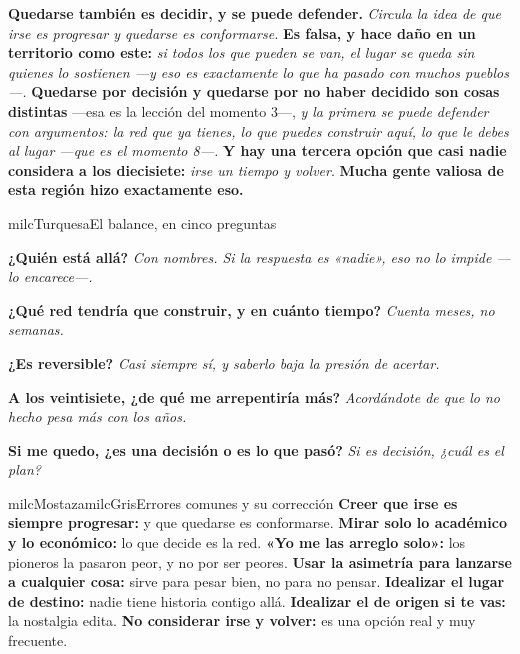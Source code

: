 \documentclass[11pt,letterpaper]{article}
\newcommand{\milcpaso}[3]{%
\Needspace{4\baselineskip}%
\begin{tcolorbox}[enhanced,colback=white,colframe=milcLinea,arc=1.5mm,boxrule=.9pt,
  left=14mm,right=4mm,top=3mm,bottom=3mm,before skip=4pt,after skip=4pt,
  fontupper=\RaggedRight,
  overlay={\node[anchor=north west,circle,fill=#2,text=white,inner sep=0pt,
    minimum size=7.4mm,font=\sffamily\bfseries\small]
    at ([xshift=3.6mm,yshift=-3.2mm]frame.north west) {#1};}]
#3
\end{tcolorbox}}
\begin{document}
\milcpaso{4}{milcTurquesa}{\textbf{Quedarse también es decidir, y se puede defender.} \emph{Circula la idea de que irse es progresar y quedarse es conformarse.} \textbf{Es falsa, y hace daño en un territorio como este:} \emph{si todos los que pueden se van, el lugar se queda sin quienes lo sostienen ---y eso es exactamente lo que ha pasado con muchos pueblos---.} \textbf{Quedarse por decisión y quedarse por no haber decidido son cosas distintas} ---esa es la lección del momento 3---, \emph{y la primera se puede defender con argumentos: la red que ya tienes, lo que puedes construir aquí, lo que le debes al lugar ---que es el momento 8---.} \textbf{Y hay una tercera opción que casi nadie considera a los diecisiete:} \emph{irse un tiempo y volver}. \textbf{Mucha gente valiosa de esta región hizo exactamente eso.}}

\begin{drawbox}{milcTurquesa}{El balance, en cinco preguntas}
\begin{pasoslista}
\item \textbf{¿Quién está allá?} \emph{Con nombres. Si la respuesta es «nadie», eso no lo impide ---lo encarece---.}
\item \textbf{¿Qué red tendría que construir, y en cuánto tiempo?} \emph{Cuenta meses, no semanas.}
\item \textbf{¿Es reversible?} \emph{Casi siempre sí, y saberlo baja la presión de acertar.}
\item \textbf{A los veintisiete, ¿de qué me arrepentiría más?} \emph{Acordándote de que lo no hecho pesa más con los años.}
\item \textbf{Si me quedo, ¿es una decisión o es lo que pasó?} \emph{Si es decisión, ¿cuál es el plan?}
\end{pasoslista}
\end{drawbox}

\begin{softbox}{milcMostaza}{milcGris}{Errores comunes y su corrección}
\textbf{Creer que irse es siempre progresar:} y que quedarse es conformarse. \textbf{Mirar solo lo académico y lo económico:} lo que decide es la red. \textbf{«Yo me las arreglo solo»:} los pioneros la pasaron peor, y no por ser peores. \textbf{Usar la asimetría para lanzarse a cualquier cosa:} sirve para pesar bien, no para no pensar. \textbf{Idealizar el lugar de destino:} nadie tiene historia contigo allá. \textbf{Idealizar el de origen si te vas:} la nostalgia edita. \textbf{No considerar irse y volver:} es una opción real y muy frecuente.
\end{softbox}
\end{document}
